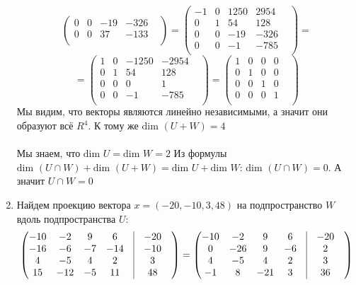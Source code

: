 \documentclass[a4paper,12pt]{article}
\begin{document}
\begin{enumerate}
\[\begin{pmatrix}
0 & 0 & -19 & -326 & \\
0 & 0 & 37 & -133 & \\
\end{pmatrix}
=
\begin{pmatrix}
-1 & 0 & 1250 & 2954 & \\
0 & 1 & 54 & 128 & \\
0 & 0 & -19 & -326 & \\
0 & 0 & -1 & -785 & \\
\end{pmatrix}
=
\]
\[
=
\begin{pmatrix}
1 & 0 & -1250 & -2954 & \\
0 & 1 & 54 & 128 & \\
0 & 0 & 0 & 1  & \\
0 & 0 & -1 & -785 & \\
\end{pmatrix}
=
\begin{pmatrix}
1 & 0 & 0 & 0 & \\
0 & 1 & 0 & 0 & \\
0 & 0 & 1 & 0 & \\
0 & 0 & 0& 1 & \\
\end{pmatrix}
\]
Мы видим, что векторы являются линейно независимыми, а значит они образуют всё $R^4$. К тому же $\text{dim } (U + W) = 4$
\\\\
Мы знаем, что $\text{dim } U = \text{dim } W = 2$ Из формулы $\text{dim }  ( U \cap W) + \text{dim } (U + W) = \text{dim }U + \text{dim } W$: $\text{dim }  ( U \cap W) = 0$. А значит $U \cap W = 0$ 
\item Найдем проекцию вектора $x = (-20, -10, 3, 48)$ на подпространство $W$ вдоль подпространства $U$:
\[
\begin{pmatrix}
-10 & -2 & 9 & 6 & \vrule &-20 & \\
-16 & -6& -7& -14 & \vrule &-10& \\
4 & -5 & 4 & 2 & \vrule &3 & \\
15 & -12 & -5 & 11 & \vrule &48 & \\
\end{pmatrix}
=
\begin{pmatrix}
-10 & -2 & 9 & 6 & \vrule &-20 & \\
0 & -26 & 9 & -6 & \vrule &2 & \\
4 & -5 & 4 & 2 & \vrule &3 & \\
-1 & 8 & -21 & 3 & \vrule &36 & \\
\end{pmatrix}
\]
\end{enumerate}
\end{document}
